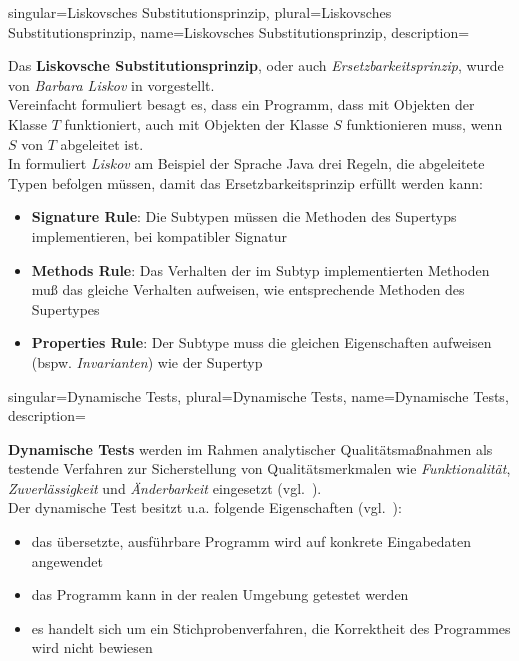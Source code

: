 {
singular={Liskovsches Substitutionsprinzip},
plural={Liskovsches Substitutionsprinzip},
name={Liskovsches Substitutionsprinzip},
description={
Das \textbf{Liskovsche Substitutionsprinzip}, oder auch \textit{Ersetzbarkeitsprinzip}, wurde von \textit{Barbara Liskov} in \cite{Lis87} vorgestellt.\\
Vereinfacht formuliert besagt es, dass ein Programm, dass mit Objekten der Klasse $T$ funktioniert, auch mit Objekten der Klasse $S$ funktionieren muss, wenn $S$ von $T$ abgeleitet ist.\\
In \cite[174 ff.]{LG00} formuliert \textit{Liskov} am Beispiel der Sprache Java drei Regeln, die abgeleitete Typen befolgen müssen, damit das Ersetzbarkeitsprinzip erfüllt werden kann:
\begin{itemize}
\item \textbf{Signature Rule}: Die Subtypen müssen die Methoden des Supertyps implementieren, bei kompatibler Signatur
\item \textbf{Methods Rule}: Das Verhalten der im Subtyp implementierten Methoden muß das gleiche Verhalten aufweisen, wie entsprechende Methoden des Supertypes
\item \textbf{Properties Rule}: Der Subtype muss die gleichen Eigenschaften aufweisen (bspw. \textit{Invarianten}) wie der Supertyp
\end{itemize}
}
}

{
singular={Dynamische Tests},
plural={Dynamische Tests},
name={Dynamische Tests},
description={
\textbf{Dynamische Tests} werden im Rahmen analytischer Qualitätsmaßnahmen als testende Verfahren zur Sicherstellung von Qualitätsmerkmalen wie \textit{Funktionalität}, \textit{Zuverlässigkeit} und \textit{Änderbarkeit} eingesetzt (vgl.~\cite[Abb. 5.1-2, 394]{Bal97}).\\
Der dynamische Test besitzt u.a. folgende Eigenschaften  (vgl.~\cite[396]{Bal97}):
\begin{itemize}
    \item das übersetzte, ausführbare Programm wird auf konkrete Eingabedaten angewendet
    \item das Programm kann in der realen Umgebung getestet werden
    \item es handelt sich um ein Stichprobenverfahren, die Korrektheit des Programmes wird nicht bewiesen
\end{itemize}
}
}